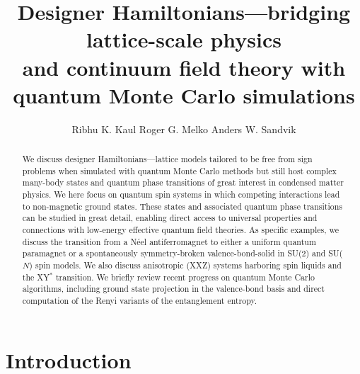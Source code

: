 \documentclass[range]{ar2e}
\begin{document}






\title{Designer Hamiltonians---bridging lattice-scale physics \\ and continuum field theory with 
quantum Monte Carlo simulations} 

\author{Ribhu K. Kaul
Roger G. Melko
Anders W. Sandvik
}

\begin{abstract}
We discuss designer Hamiltonians---lattice models tailored to be free from sign problems when simulated with quantum 
Monte Carlo methods but still host complex  many-body states and quantum phase transitions of great interest in condensed matter 
physics. We here focus on quantum spin systems in which competing interactions lead to non-magnetic ground states. These states and 
associated quantum phase transitions can be studied in great detail, enabling direct access to universal properties and connections 
with low-energy effective quantum field theories. As specific examples, we discuss the transition from a N\'eel antiferromagnet to 
either a uniform quantum paramagnet or a spontaneously symmetry-broken valence-bond-solid in SU($2$) and SU($N$) spin models. We also 
discuss anisotropic (XXZ) systems harboring spin liquids and the XY$^*$ transition. We briefly review recent progress on quantum Monte 
Carlo algorithms, including ground state projection in the valence-bond basis and direct computation of the Renyi variants of the 
entanglement entropy.
\end{abstract}

\maketitle

\section{Introduction}
\label{sec:intro}
\end{document}
